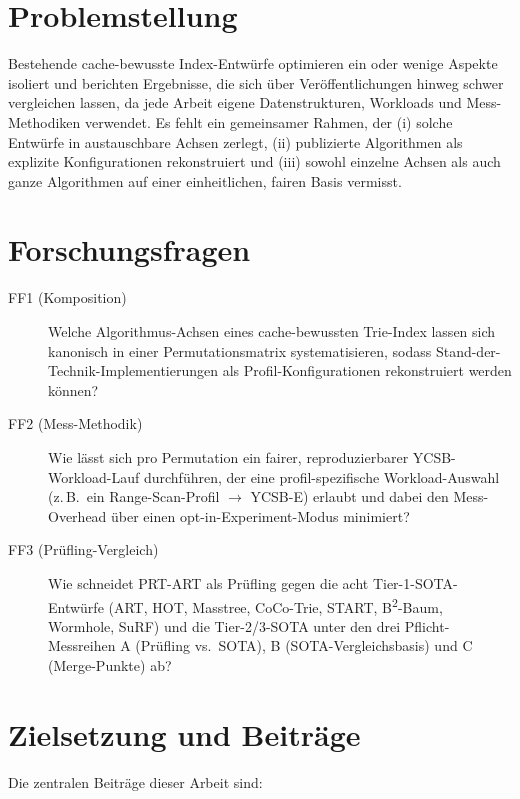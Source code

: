 \section{Problemstellung}\label{sec:problem}

Bestehende cache-bewusste Index-Entwürfe optimieren ein oder wenige Aspekte isoliert und
berichten Ergebnisse, die sich über Veröffentlichungen hinweg schwer vergleichen lassen, da
jede Arbeit eigene Datenstrukturen, Workloads und Mess-Methodiken verwendet. Es fehlt ein
gemeinsamer Rahmen, der (i) solche Entwürfe in austauschbare Achsen zerlegt, (ii)
publizierte Algorithmen als explizite Konfigurationen rekonstruiert und (iii) sowohl
einzelne Achsen als auch ganze Algorithmen auf einer einheitlichen, fairen Basis vermisst.

\section{Forschungsfragen}\label{sec:rqs}

\begin{description}
  \item[FF1 (Komposition)] Welche Algorithmus-Achsen eines cache-bewussten Trie-Index lassen
        sich kanonisch in einer Permutationsmatrix systematisieren, sodass
        Stand-der-Technik-Implementierungen als Profil-Konfigurationen rekonstruiert werden
        können?
  \item[FF2 (Mess-Methodik)] Wie lässt sich pro Permutation ein fairer, reproduzierbarer
        YCSB-Workload-Lauf durchführen, der eine profil-spezifische Workload-Auswahl (z.\,B.\
        ein Range-Scan-Profil $\to$ YCSB-E) erlaubt und dabei den Mess-Overhead über einen
        opt-in-Experiment-Modus minimiert?
  \item[FF3 (Prüfling-Vergleich)] Wie schneidet PRT-ART als Prüfling gegen die acht
        Tier-1-SOTA-Entwürfe (ART, HOT, Masstree, CoCo-Trie, START, B\textsuperscript{2}-Baum,
        Wormhole, SuRF) und die Tier-2/3-SOTA unter den drei Pflicht-Messreihen A (Prüfling
        vs.\ SOTA), B (SOTA-Vergleichsbasis) und C (Merge-Punkte) ab?
\end{description}

\section{Zielsetzung und Beiträge}\label{sec:contributions}

Die zentralen Beiträge dieser Arbeit sind:

